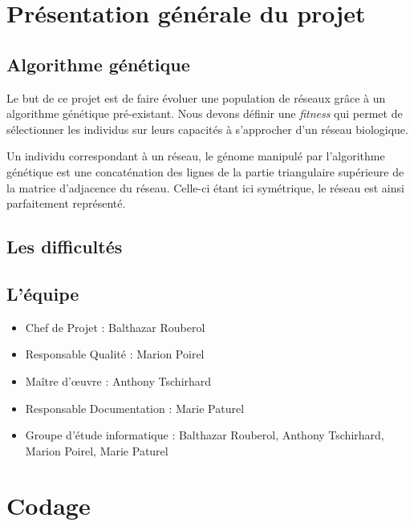 


\maketitle


\section{Présentation générale du projet}

\subsection{Algorithme génétique}
Le but de ce projet est de faire évoluer une population de réseaux grâce à un algorithme génétique pré-existant. Nous devons définir une \textit{fitness} qui permet de sélectionner les individus sur leurs capacités à s'approcher d'un réseau biologique.

Un individu correspondant à un réseau, le génome manipulé par l'algorithme génétique est une concaténation des lignes de la partie triangulaire supérieure de la matrice d'adjacence du réseau. Celle-ci étant ici symétrique, le réseau est ainsi parfaitement représenté.

\subsection{Les difficultés}

\subsection{L'équipe}
\begin{itemize}
\item Chef de Projet : Balthazar Rouberol
\item Responsable Qualité : Marion Poirel
\item Ma\^itre d'œuvre : Anthony Tschirhard
\item Responsable Documentation : Marie Paturel
\item Groupe d'étude informatique : Balthazar Rouberol, Anthony Tschirhard, Marion Poirel, Marie Paturel
\end{itemize}

\section{Codage}

